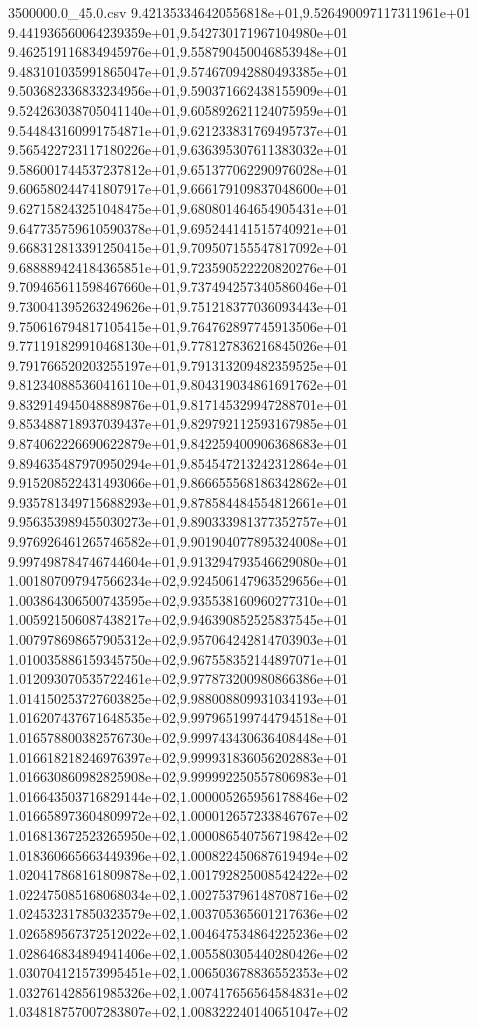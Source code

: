 \begin{filecontents*}{3500000.0_45.0.csv}
9.421353346420556818e+01,9.526490097117311961e+01
9.441936560064239359e+01,9.542730171967104980e+01
9.462519116834945976e+01,9.558790450046853948e+01
9.483101035991865047e+01,9.574670942880493385e+01
9.503682336833234956e+01,9.590371662438155909e+01
9.524263038705041140e+01,9.605892621124075959e+01
9.544843160991754871e+01,9.621233831769495737e+01
9.565422723117180226e+01,9.636395307611383032e+01
9.586001744537237812e+01,9.651377062290976028e+01
9.606580244741807917e+01,9.666179109837048600e+01
9.627158243251048475e+01,9.680801464654905431e+01
9.647735759610590378e+01,9.695244141515740921e+01
9.668312813391250415e+01,9.709507155547817092e+01
9.688889424184365851e+01,9.723590522220820276e+01
9.709465611598467660e+01,9.737494257340586046e+01
9.730041395263249626e+01,9.751218377036093443e+01
9.750616794817105415e+01,9.764762897745913506e+01
9.771191829910468130e+01,9.778127836216845026e+01
9.791766520203255197e+01,9.791313209482359525e+01
9.812340885360416110e+01,9.804319034861691762e+01
9.832914945048889876e+01,9.817145329947288701e+01
9.853488718937039437e+01,9.829792112593167985e+01
9.874062226690622879e+01,9.842259400906368683e+01
9.894635487970950294e+01,9.854547213242312864e+01
9.915208522431493066e+01,9.866655568186342862e+01
9.935781349715688293e+01,9.878584484554812661e+01
9.956353989455030273e+01,9.890333981377352757e+01
9.976926461265746582e+01,9.901904077895324008e+01
9.997498784746744604e+01,9.913294793546629080e+01
1.001807097947566234e+02,9.924506147963529656e+01
1.003864306500743595e+02,9.935538160960277310e+01
1.005921506087438217e+02,9.946390852525837545e+01
1.007978698657905312e+02,9.957064242814703903e+01
1.010035886159345750e+02,9.967558352144897071e+01
1.012093070535722461e+02,9.977873200980866386e+01
1.014150253727603825e+02,9.988008809931034193e+01
1.016207437671648535e+02,9.997965199744794518e+01
1.016578800382576730e+02,9.999743430636408448e+01
1.016618218246976397e+02,9.999931836056202883e+01
1.016630860982825908e+02,9.999992250557806983e+01
1.016643503716829144e+02,1.000005265956178846e+02
1.016658973604809972e+02,1.000012657233846767e+02
1.016813672523265950e+02,1.000086540756719842e+02
1.018360665663449396e+02,1.000822450687619494e+02
1.020417868161809878e+02,1.001792825008542422e+02
1.022475085168068034e+02,1.002753796148708716e+02
1.024532317850323579e+02,1.003705365601217636e+02
1.026589567372512022e+02,1.004647534864225236e+02
1.028646834894941406e+02,1.005580305440280426e+02
1.030704121573995451e+02,1.006503678836552353e+02
1.032761428561985326e+02,1.007417656564584831e+02
1.034818757007283807e+02,1.008322240140651047e+02

\end{filecontents*}
